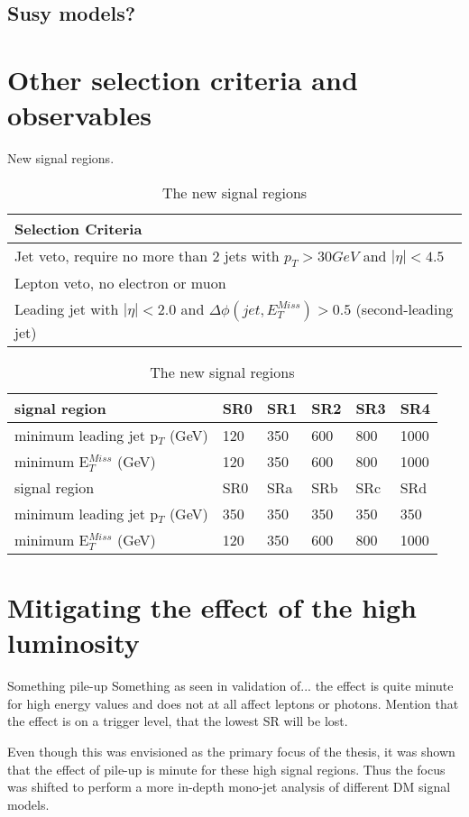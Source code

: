 \subsection{Susy models?}
\section{Other selection criteria and observables}
New signal regions.
\begin{table}[h]
\begin{center}
\begin{tabular}{l}
\hline
Selection Criteria \\ \hline
Jet veto, require no more than 2 jets with $p_T > 30 GeV$ and $|\eta| < 4.5$ \\
Lepton veto, no electron or muon \\
Leading jet with $|\eta| < 2.0$ and $\Delta \phi (jet, E_T^{Miss})>0.5$ (second-leading jet) \\ \hline
\end{tabular}
\begin{tabular}{l l l l l l}
signal region & SR0 & SR1 & SR2 & SR3 & SR4 \\ \hline
minimum leading jet p$_T$ (GeV) & 120 & 350 & 600 & 800 & 1000 \\
minimum E$^{Miss}_T$ (GeV) & 120 & 350 & 600 & 800 & 1000 \\ \hline
signal region & SR0 & SRa & SRb & SRc & SRd \\ \hline
minimum leading jet p$_T$ (GeV) & 350 & 350 & 350 & 350 & 350 \\
minimum E$^{Miss}_T$ (GeV) & 120 & 350 & 600 & 800 & 1000 \\ \hline
\end{tabular}
\label{tab:newsr}
\caption{The new signal regions}
\end{center}
\end{table}

\section{Mitigating the effect of the high luminosity}
Something pile-up
Something as seen in validation of... the effect is quite minute for high energy values and does not at all affect leptons or photons. Mention that the effect is on a trigger level, that the lowest SR will be lost.

Even though this was envisioned as the primary focus of the thesis, it was shown that the effect of pile-up is minute for these high signal regions. Thus the focus was shifted to perform a more in-depth mono-jet analysis of different DM signal models.
